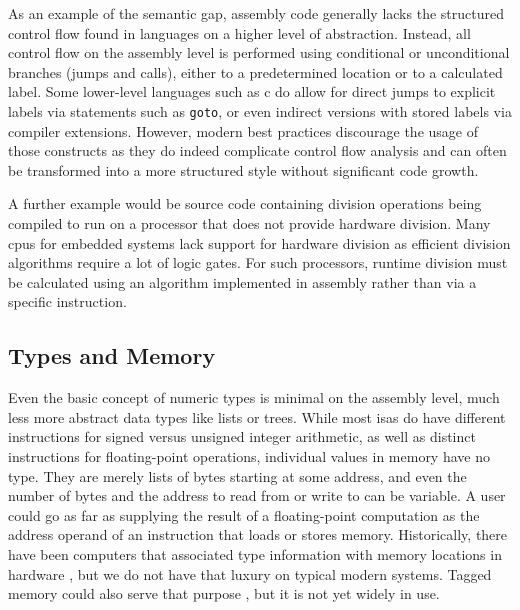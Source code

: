As an example of the semantic gap, assembly code generally lacks the structured control flow found in languages on a higher level of abstraction.
Instead, all control flow on the assembly level is performed using conditional or unconditional branches (jumps and calls), either to a predetermined location or to a calculated label.
Some lower-level languages such as \gls{c} do allow for direct jumps to explicit labels via statements such as \lstinline|goto|, or even indirect versions with stored labels via compiler extensions.
However, modern best practices discourage the usage of those constructs as they do indeed complicate control flow analysis and can often be transformed into a more structured style without significant code growth.

A further example would be source code containing division operations being compiled to run on a processor that does not provide hardware division.
Many \acp{cpu} for embedded systems lack support for hardware division as efficient division algorithms require a lot of logic gates.
For such processors, runtime division must be calculated using an algorithm implemented in assembly rather than via a specific instruction.

\subsection{Types and Memory}
Even the basic concept of numeric types is minimal on the assembly level, much less more abstract data types like lists or trees.
While most \acp{isa} do have different instructions for signed versus unsigned integer arithmetic, as well as distinct instructions for floating-point operations, individual values in memory have no type.
They are merely lists of bytes starting at some address, and even the number of bytes and the address to read from or write to can be variable.
A user could go as far as supplying the result of a floating-point computation as the address operand of an instruction that loads or stores memory.
Historically, there have been computers that associated type information with memory locations in hardware \autocite{feustel1972rice,feustel1973advantages,thornton2008rice}, but we do not have that luxury on typical modern systems.
Tagged memory could also serve that purpose , but it is not yet widely in use.


